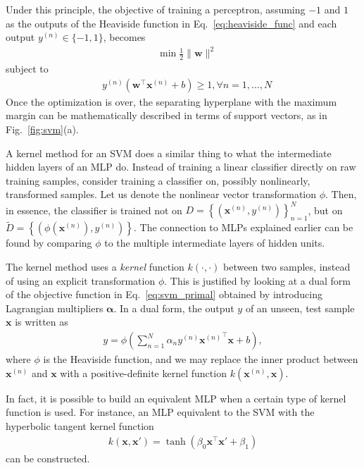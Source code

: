 \documentclass{now}
\newcommand{\vect}[1]{\mathbf{#1}}
\newcommand{\vects}[1]{\boldsymbol{#1}}
\newcommand{\vx}[0]{\vect{x}}
\newcommand{\vw}[0]{\vect{w}}
\newcommand{\valpha}[0]{\vects{\alpha}}
\begin{document}
Under this principle, the objective of training a perceptron, assuming $-1$ and
$1$ as the outputs of the Heaviside function in Eq.~\eqref{eq:heaviside_func}
and each output $y^{(n)} \in \{ -1, 1 \}$, becomes
\begin{align}
    \label{eq:svm_primal}
    &\min \frac{1}{2} \| \vw \|^2
\end{align}
subject to
\begin{align*}
    &y^{(n)} \left( \vw^\top \vx^{(n)} + b \right) \geq 1,
    \forall n = 1, \dots , N
\end{align*}
Once the optimization is over, the separating hyperplane with the maximum margin
can be mathematically described in terms of support vectors, as in
Fig.~\ref{fig:svm}(a).

A kernel method for an SVM does a similar thing to what the intermediate hidden
layers of an MLP do. Instead of training a linear classifier directly on raw
training samples, consider training a classifier on, possibly nonlinearly,
transformed samples. Let us denote the nonlinear vector transformation $\phi$.
Then, in essence, the classifier is trained not on $D = \left\{ \left(
\vx^{(n)}, y^{(n)} \right) \right\}_{n=1}^N$, but on $\tilde{D} = \left\{ \left(
\phi(\vx^{(n)}), y^{(n)} \right) \right\}$. The connection to MLPs explained
earlier can be found by comparing $\phi$ to the multiple intermediate layers of
hidden units.

The kernel method uses a \textit{kernel} function $k(\cdot, \cdot)$ between two
samples, instead of using an explicit transformation $\phi$.  This is justified
by looking at a dual form of the objective function in Eq.~\eqref{eq:svm_primal}
obtained by introducing Lagrangian multipliers $\valpha$.  In a dual form, the
output $y$ of an unseen, test sample $\vx$ is written as
\begin{align*}
    y = \phi \left( \sum_{n=1}^N \alpha_n y^{(n)}
    {\vx^{(n)}}^\top \vx + b \right),
\end{align*}
where $\phi$ is the Heaviside function, and we may replace the inner product
between $\vx^{(n)}$ and $\vx$  with a positive-definite kernel function
$k(\vx^{(n)}, \vx)$.

In fact, it is possible to build an equivalent MLP when a certain type of kernel
function is used. For instance, an MLP equivalent to the SVM with the hyperbolic
tangent kernel function 
\begin{align*}
    k(\vx, \vx') = \tanh(\beta_0 \vx^\top \vx' + \beta_1)
\end{align*}
can be constructed.
\end{document}
